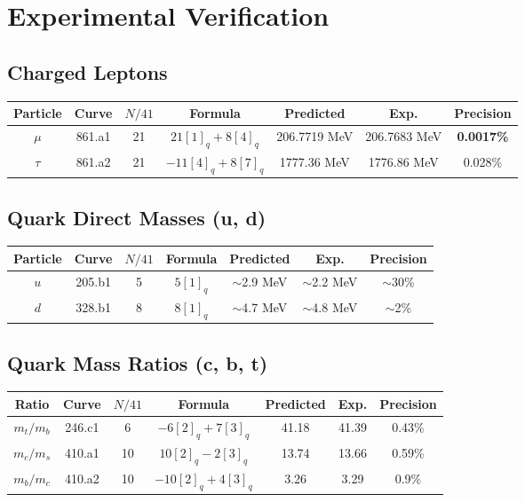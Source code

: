 ﻿\documentclass[11pt,a4paper]{article}
\theoremstyle{definition}
\begin{document}
\section{Experimental Verification}

\subsection{Charged Leptons}
\begin{table}[h]
\centering
\begin{tabular}{@{}ccccccc@{}}
\toprule
\textbf{Particle} & \textbf{Curve} & $N/41$ & \textbf{Formula} & \textbf{Predicted} & \textbf{Exp.} & \textbf{Precision} \\
\midrule
$\mu$ & 861.a1 & 21 & $21[1]_q + 8[4]_q$ & 206.7719 MeV & 206.7683 MeV & \textbf{0.0017\%} \\
$\tau$ & 861.a2 & 21 & $-11[4]_q + 8[7]_q$ & 1777.36 MeV & 1776.86 MeV & 0.028\% \\
\bottomrule
\end{tabular}
\end{table}

\subsection{Quark Direct Masses (u, d)}
\begin{table}[h]
\centering
\begin{tabular}{@{}ccccccc@{}}
\toprule
\textbf{Particle} & \textbf{Curve} & $N/41$ & \textbf{Formula} & \textbf{Predicted} & \textbf{Exp.} & \textbf{Precision} \\
\midrule
$u$ & 205.b1 & 5 & $5[1]_q$ & $\sim$2.9 MeV & $\sim$2.2 MeV & $\sim$30\% \\
$d$ & 328.b1 & 8 & $8[1]_q$ & $\sim$4.7 MeV & $\sim$4.8 MeV & $\sim$2\% \\
\bottomrule
\end{tabular}
\end{table}

\subsection{Quark Mass Ratios (c, b, t)}
\begin{table}[h]
\centering
\begin{tabular}{@{}ccccccc@{}}
\toprule
\textbf{Ratio} & \textbf{Curve} & $N/41$ & \textbf{Formula} & \textbf{Predicted} & \textbf{Exp.} & \textbf{Precision} \\
\midrule
$m_t/m_b$ & 246.c1 & 6 & $-6[2]_q + 7[3]_q$ & 41.18 & 41.39 & 0.43\% \\
$m_c/m_s$ & 410.a1 & 10 & $10[2]_q - 2[3]_q$ & 13.74 & 13.66 & 0.59\% \\
$m_b/m_c$ & 410.a2 & 10 & $-10[2]_q + 4[3]_q$ & 3.26 & 3.29 & 0.9\% \\
\bottomrule
\end{tabular}
\end{table}
\end{document}
